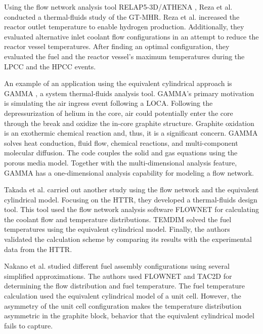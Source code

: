 Using the flow network analysis tool RELAP5-3D/ATHENA \cite{inl_relap5-3dathena_2005}, Reza et al. \cite{reza_design_2006} conducted a thermal-fluids study of the GT-MHR.
Reza et al. increased the reactor outlet temperature to enable hydrogen production.
Additionally, they evaluated alternative inlet coolant flow configurations in an attempt to reduce the reactor vessel temperatures.
After finding an optimal configuration, they evaluated the fuel and the reactor vessel's maximum temperatures during the \gls{LPCC} and the \gls{HPCC} events.

An example of an application using the equivalent cylindrical approach is GAMMA \cite{lim_gamma_2006}\cite{no_multi-component_2007}, a system thermal-fluids analysis tool.
GAMMA's primary motivation is simulating the air ingress event following a LOCA.
Following the depressurization of helium in the core, air could potentially enter the core through the break and oxidize the in-core graphite structure.
Graphite oxidation is an exothermic chemical reaction and, thus, it is a significant concern.
GAMMA solves heat conduction, fluid flow, chemical reactions, and multi-component molecular diffusion.
The code couples the solid and gas equations using the porous media model.
Together with the multi-dimensional analysis feature, GAMMA has a one-dimensional analysis capability for  modeling a flow network.

Takada et al. \cite{takada_core_2004} carried out another study using the flow network and the equivalent cylindrical model.
Focusing on the \gls{HTTR}, they developed a thermal-fluids design tool.
This tool used the flow network analysis software FLOWNET \cite{maruyama_verification_1988} for calculating the coolant flow and temperature distributions.
TEMDIM \cite{maruyama_verification_1988} solved the fuel temperatures using the equivalent cylindrical model.
Finally, the authors validated the calculation scheme by comparing its results with the experimental data from the \gls{HTTR}.

Nakano et al. \cite{nakano_conceptual_2008} studied different fuel assembly configurations using several simplified approximations.
The authors used FLOWNET and TAC2D for determining the flow distribution and fuel temperature.
The fuel temperature calculation used the equivalent cylindrical model of a unit cell.
However, the asymmetry of the unit cell configuration makes the temperature distribution asymmetric in the graphite block, behavior that the equivalent cylindrical model fails to capture.

